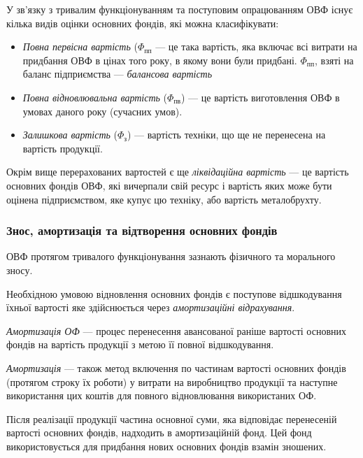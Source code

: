 \documentclass[a5paper,10pt,notitlepage,pdftex,headsepline]{scrartcl}
\begin{document}
      У зв’язку з тривалим функціонуванням та поступовим опрацюванням ОВФ
      існує кілька видів оцінки основних фондів, які можна класифікувати:
      \begin{itemize}
        \item \emph{Повна первісна вартість} ($\Phi_\text{пп}$ --- це така
          вартість, яка включає всі витрати на придбання ОВФ в цінах того
          року, в якому вони були придбані.
          $\Phi_\text{пп}$, взяті на баланс підприємства --- \emph{балансова
          вартість}
        \item \emph{Повна відновлювальна вартість} ($\Phi_\text{пв}$) --- це
          вартість виготовлення ОВФ в умовах даного року (сучасних умов).
        \item \emph{Залишкова вартість} ($\Phi_\text{з}$) --- вартість
          техніки, що ще не перенесена на вартість продукції.
      \end{itemize}

      Окрім вище перерахованих вартостей є ще \emph{ліквідаційна вартість} ---
      це вартість основних фондів ОВФ, які вичерпали свій ресурс і вартість
      яких може бути оцінена підприємством, яке купує цю техніку, або вартість
      металобрухту.

    \subsubsection{Знос, амортизація та відтворення основних фондів}
      ОВФ протягом тривалого функціонування зазнають фізичного та морального
      зносу.

      Необхідною умовою відновлення основних фондів є поступове відшкодування
      їхньої вартості яке здійснюється через \emph{амортизаційні відрахування}.

      \emph{Амортизація ОФ} --- процес перенесення авансованої раніше вартості
      основних фондів на вартість продукції з метою її повної відшкодування.

      \emph{Амортизація} --- також метод включення по частинам вартості
      основних фондів (протягом строку їх роботи) у витрати на виробництво
      продукції та наступне використання цих коштів для повного відновлювання
      використаних ОФ.

      Після реалізації продукції частина основної суми, яка відповідає
      перенесеній вартості основних фондів, надходить в амортизаційній фонд.
      Цей фонд використовується для придбання нових основних фондів взамін
      зношених.
\end{document}
